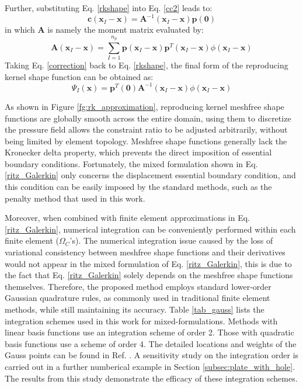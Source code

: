 Further, substituting Eq. \ref{rkshape} into Eq. \eqref{cc2} leads to:
\begin{equation}\label{correction}
\boldsymbol{c}(\boldsymbol{x}_I-\boldsymbol{x}) = \boldsymbol{A}^{-1}(\boldsymbol{x}_I-\boldsymbol{x}) \boldsymbol{p}(\boldsymbol{0})
\end{equation}
in which $\boldsymbol{A}$ is namely the moment matrix evaluated by:
\begin{equation}
\boldsymbol{A}(\boldsymbol{x}_I-\boldsymbol{x}) = \sum_{I=1}^{n_p} \boldsymbol{p}(\boldsymbol{x}_I-\boldsymbol{x}) \boldsymbol{p}^T(\boldsymbol{x}_I-\boldsymbol{x}) \phi(\boldsymbol{x}_I-\boldsymbol{x})
\end{equation}
Taking Eq. \eqref{correction} back to Eq. \eqref{rkshape}, the final form of the reproducing kernel shape function can be obtained as:
\begin{equation}
\Psi_I(\boldsymbol{x}) = \boldsymbol{p}^T(\boldsymbol{0}) \boldsymbol{A}^{-1}(\boldsymbol{x}_I-\boldsymbol{x}) \phi(\boldsymbol{x}_I-\boldsymbol{x})
\end{equation}

As shown in Figure \ref{fg:rk_approximation},
reproducing kernel meshfree shape functions are globally smooth across the entire domain,
using them to discretize the pressure field allows the constraint ratio to be adjusted arbitrarily, without being limited by element topology.
Meshfree shape functions generally lack the Kronecker delta property, which prevents the direct imposition of essential boundary conditions.
Fortunately, the mixed formulation shown in Eq. \ref{ritz_Galerkin} only concerns the displacement essential boundary condition, and this condition can be easily imposed by the standard methods, such as the penalty method that used in this work.

Moreover,
when combined with finite element approximations in Eq. \ref{ritz_Galerkin},
numerical integration can be conveniently performed within each finite element ($\Omega_C$'s).
The numerical integration issue caused by the loss of variational consistency between meshfree shape functions and their derivatives \cite{wu2021} would not appear in the mixed formulation of Eq. \ref{ritz_Galerkin}, this is due to the fact that Eq. \ref{ritz_Galerkin} solely depends on the meshfree shape functions themselves.
Therefore, the proposed method employs standard lower-order Gaussian quadrature rules,
as commonly used in traditional finite element methods,
while still maintaining its accuracy.
Table \ref{tab_gauss} lists the integration schemes used in this work for mixed-formulations.
Methods with linear basis functions use an integration scheme of order 2.
Those with quadratic basis functions use a scheme of order 4.
The detailed locations and weights of the Gauss points can be found in Ref. \cite{bathe1996}.
A sensitivity study on the integration order is carried out in a further numberical example in Section \ref{subsec:plate_with_hole}.
The results from this study demonstrate the efficacy of these integration schemes.

